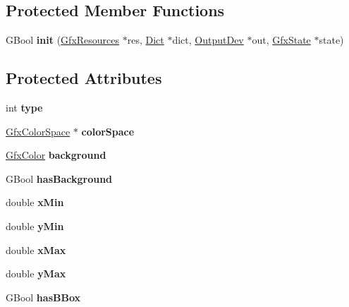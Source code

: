 \subsection*{Protected Member Functions}
\begin{DoxyCompactItemize}
\item 
\mbox{\label{class_gfx_shading_a0507b44195431d896eb6fd89215ad974}} 
G\+Bool {\bfseries init} (\hyperlink{class_gfx_resources}{Gfx\+Resources} $\ast$res, \hyperlink{class_dict}{Dict} $\ast$dict, \hyperlink{class_output_dev}{Output\+Dev} $\ast$out, \hyperlink{class_gfx_state}{Gfx\+State} $\ast$state)
\end{DoxyCompactItemize}
\subsection*{Protected Attributes}
\begin{DoxyCompactItemize}
\item 
\mbox{\label{class_gfx_shading_ac0c16611c00bb25e2da871376128374a}} 
int {\bfseries type}
\item 
\mbox{\label{class_gfx_shading_a4d1ea908889fac381b155c7c645dcf2e}} 
\hyperlink{class_gfx_color_space}{Gfx\+Color\+Space} $\ast$ {\bfseries color\+Space}
\item 
\mbox{\label{class_gfx_shading_ac86a2a712f6e0fc297b0fdebc078002d}} 
\hyperlink{struct_gfx_color}{Gfx\+Color} {\bfseries background}
\item 
\mbox{\label{class_gfx_shading_ab57b3f4d8f3588102bece0c67ff5787a}} 
G\+Bool {\bfseries has\+Background}
\item 
\mbox{\label{class_gfx_shading_a9d40e3fb2cf5114ca783dab01e203c0a}} 
double {\bfseries x\+Min}
\item 
\mbox{\label{class_gfx_shading_a16594f23c013169d38e9f1735e684110}} 
double {\bfseries y\+Min}
\item 
\mbox{\label{class_gfx_shading_aeecd4ce396af5a7a4a8c6250b1054495}} 
double {\bfseries x\+Max}
\item 
\mbox{\label{class_gfx_shading_aaa49bbbd40be53e3186b3d7b93b2543a}} 
double {\bfseries y\+Max}
\item 
\mbox{\label{class_gfx_shading_a190776058998f302dd6ef9c1789c671e}} 
G\+Bool {\bfseries has\+B\+Box}
\end{DoxyCompactItemize}


